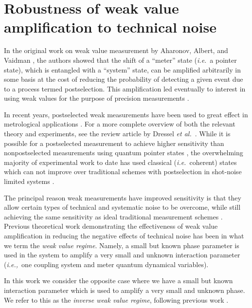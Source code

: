 \chapter{Robustness of weak value amplification to technical noise}\label{ch:iwv}
In the original work on weak value measurement by Aharonov, Albert, and Vaidman \cite{Aharonov1988}, the authors showed that the shift of a ``meter'' state (\emph{i.e.}~a pointer state), which is entangled with a ``system'' state, can be amplified arbitrarily in some basis at the cost of reducing the probability of detecting a given event due to a process termed postselection.  This amplification led eventually to interest in using weak values for the purpose of precision measurements \cite{Hosten2008,Dixon2009}. 
 
In recent years, postselected weak measurements have been used to great effect in metrological applications \cite{Dixon2009,Starling2009,Starling2010,Starling2010a,Howell2010,Hogan:11,Egan:12,Strubi2013,Viza:13,Zhou2012,Zhou2013}.  For a more complete overview of both the relevant theory and experiments, see the review article by Dressel \emph{et al.}~\cite{Dressel2014}.  While it is possible for a postselected measurement to achieve higher sensitivity than nonpostselected measurements using quantum pointer states \cite{Pang2014,Pang2015}, the overwhelming majority of experimental work to date has used classical (\emph{i.e.}~coherent) states which can not improve over traditional schemes with postselection in shot-noise limited systems \cite{Pang2015}.

The principal reason weak measurements have improved sensitivity is that they allow certain types of technical and systematic noise to be overcome, while still achieving the same sensitivity as ideal  traditional measurement schemes \cite{Starling2009,Jordan2014,Knee2014,Pang2016}.  Previous theoretical work demonstrating the effectiveness of weak value amplification in reducing the negative effects of technical noise has been in what we term the \emph{weak value regime}.  Namely, a small but known phase parameter is used in the system to amplify a very small and unknown interaction parameter (\emph{i.e.,}~one coupling system and meter quantum dynamical variables).  

In this work we consider the opposite case where we have a small but known interaction parameter which is used to amplify a very small and unknown phase.  We refer to this as the \emph{inverse weak value regime}, following previous work \cite{Starling2010a,Dressel2013,Lyons2015,Kofman2012}. 


